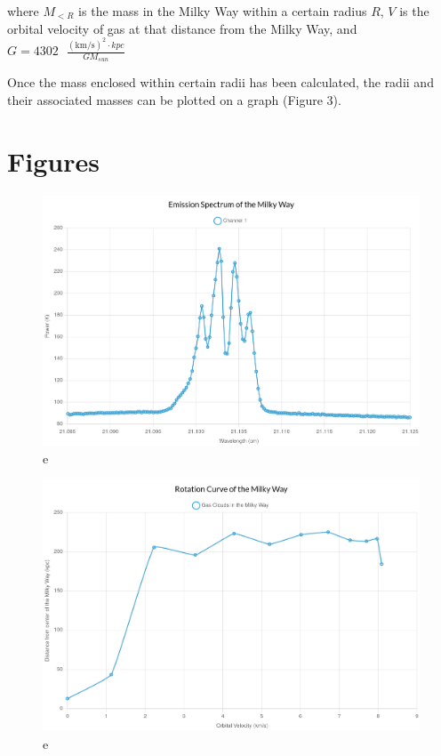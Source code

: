 \documentclass{article}
\begin{document}
where $M_{<R}$ is the mass in the Milky Way within a certain radius $R$, $V$ is the orbital velocity of gas at that distance from the Milky Way, and $G=4302\text{ }\frac{(\text{km/s})^2 \cdot kpc}{GM_{sun}}$

Once the mass enclosed within certain radii has been calculated, the radii and their associated masses can be plotted on a graph (Figure 3).

\section{Figures}
\begin{center}
    \begin{figure}[h!bt]
        \caption{
            e
            \smallskip
        }
        \includegraphics[scale=0.1]{emission-graph-lab9.jpg}
        \centering
    \end{figure}
    \begin{figure}[h!bt]
        \caption{
            e
            \smallskip
        }
        \includegraphics[scale=0.1]{rotation-curve-lab9.jpg}

\end{figure}
\end{center}
\end{document}
